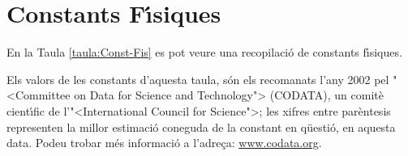 \chapter{Constants F\'{\i}siques} 


En la Taula \vref{taula:Const-Fis} es pot veure una recopilaci\'{o} de
constants f\'{\i}siques.

Els valors de les constants d'aquesta taula, s\'{o}n els recomanats
l'any 2002 pel {"<}Committee on Data for Science and Technology{">}
(\textsf{CODATA}), un comit\`{e} cient\'{\i}fic de l'{"<}International Council
for Science{">}; les xifres entre par\`{e}ntesis representen la millor
estimaci\'{o} coneguda de la constant en q\"{u}esti\'{o}, en aquesta
data. Podeu trobar  m\'{e}s informaci\'{o} a
l'adre\c{c}a: \href{http://www.codata.org/}{www.codata.org}.

